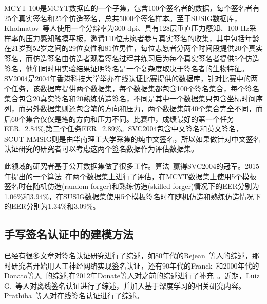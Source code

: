 MCYT-100是MCYT数据库的一个子集，包含100个签名者的数据，每个签名者有25个真实签名和25个仿造签名，总共5000个签名样本。至于SUSIG数据库，Kholmatov~\cite{kholmatov2006sigsa}等人使用一个分辨率为300 dpi、具有128层垂直压力感知、100 Hz采样率的压力感知触摸平板，邀请110位志愿者参与真实签名的收集，其中包括年龄在21岁到52岁之间的29位女性和81位男性，每位志愿者分两个时间段提供20个真实签名，而仿造签名由仿造者观看签名过程并练习后为每个真实签名者提供5个仿造签名，他们同时用实验结果证明签名是一个复杂度取决于签名者的生物特征。SV2004是2004年香港科技大学举办在线认证比赛提供的数据库，针对比赛中的两个任务，该数据库提供两个数据集，每个数据集都包含100个签名集合，每个签名集合包含20真实签名和20熟练仿造签名，不同是其中一个数据集只包含坐标时间序列，而另外数据集则还包含笔的方向和压力，两个数据集前40个集合完全不同，而后60个集合仅仅是笔的方向和压力不同。比赛中，成绩最好的第一个任务EER=2.84\%,第二个任务EER=2.89\%。SVC2004包含中文签名和英文签名，SCUT-MMSIG则是由华南理工大学采集的纯中文签名，所以如果做针对中文签名认证研究的研究者可以考虑这两个签名数据作为评估数据集。

此领域的研究者基于公开数据集做了很多工作。算法~\cite{kholmatov2005identity}赢得SVC2004的冠军。2015年提出的一个算法~\cite{fischer2015robust}在两个数据集上进行了评估，在MCYT数据集上使用5个模板签名时在随机仿造(random forger)和熟练仿造(skilled forger)情况下的EER分别为1.06\%和3.94\%，在SUSIG数据集使用5个模板签名时在随机仿造和熟练仿造情况下的EER分别为1.34\%和3.09\%。

\subsection{手写签名认证中的建模方法}

已经有很多文章对签名认证研究进行了综述，如80年代的Rejean~\cite{plamondon1989automatic}等人的综述，那时研究者开始用人工神经网络实现签名认证，还有90年代的Franck~\cite{leclerc1994automatic}和2000年代的Donato等人~\cite{impedovo2008automatic}的综述,在2012年Donate等人对之前的综述进行了补充~\cite{impedovo2012handwritten}。近期，Luiz G.~\cite{hafemann2017offline}等人对离线签名认证进行了综述，并加入基于深度学习的相关研究内容。Prathiba~\cite{prathiba2014online}等人对在线签名认证进行了综述。

